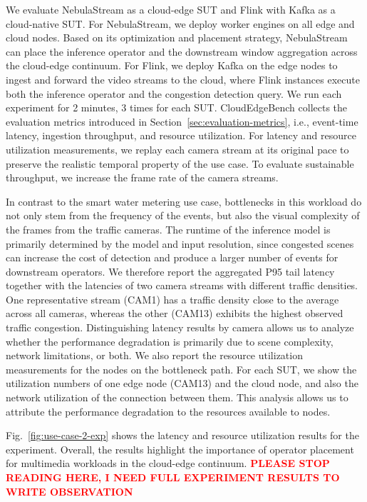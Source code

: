 \documentclass[runningheads]{llncs}
\begin{document}
We evaluate NebulaStream as a cloud-edge SUT and Flink with Kafka as a cloud-native SUT.
For NebulaStream, we deploy worker engines on all edge and cloud nodes.
Based on its optimization and placement strategy, NebulaStream can place the inference operator and the downstream window aggregation across the cloud-edge continuum.
For Flink, we deploy Kafka on the edge nodes to ingest and forward the video streams to the cloud, where Flink instances execute both the inference operator and the congestion detection query.
%
We run each experiment for 2 minutes, 3 times for each SUT.
CloudEdgeBench collects the evaluation metrics introduced in Section~\ref{sec:evaluation-metrics}, i.e., event-time latency, ingestion throughput, and resource utilization.
For latency and resource utilization measurements, we replay each camera stream at its original pace to preserve the realistic temporal property of the use case.
To evaluate sustainable throughput, we increase the frame rate of the camera streams.

In contrast to the smart water metering use case, bottlenecks in this workload do not only stem from the frequency of the events, but also the visual complexity of the frames from the traffic cameras.
The runtime of the inference model is primarily determined by the model and input resolution, since congested scenes can increase the cost of detection and produce a larger number of events for downstream operators.
We therefore report the aggregated P95 tail latency together with the latencies of two camera streams with different traffic densities.
One representative stream (CAM1) has a traffic density close to the average across all cameras, whereas the other (CAM13) exhibits the highest observed traffic congestion.
Distinguishing latency results by camera allows us to analyze whether the performance degradation is primarily due to scene complexity, network limitations, or both.
We also report the resource utilization measurements for the nodes on the bottleneck path.
For each SUT, we show the utilization numbers of one edge node (CAM13) and the cloud node, and also the network utilization of the connection between them.
This analysis allows us to attribute the performance degradation to the resources available to nodes.

Fig.~\ref{fig:use-case-2-exp} shows the latency and resource utilization results for the experiment. 
Overall, the results highlight the importance of operator placement for multimedia workloads in the cloud-edge continuum. 
\textcolor{red}{\textbf{PLEASE STOP READING HERE, I NEED FULL EXPERIMENT RESULTS TO WRITE OBSERVATION} }
\end{document}
